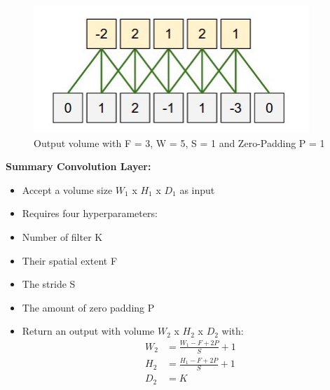 \begin{center}
  \begin{figure}[H]
  \centering
  \includegraphics[width=1\columnwidth]{images/chap2/Output_volume_WSP.png}
  \caption{Output volume with F = 3, W = 5, S = 1 and Zero-Padding P = 1 }
  \label{chap2:Outputvolume_example}
  \end{figure}
\end{center}
\textbf{Summary Convolution Layer:}
\begin{itemize}
	\item Accept a volume size $W_{1}$ x $H_{1}$ x $D_{1}$ as input
	\item Requires four hyperparameters:
	\item Number of filter K
	\item Their spatial extent F 
	\item The stride S
	\item The amount of zero padding P
	\item Return an output with volume $W_{2}$ x $H_{2}$ x $D_{2}$ with:
	\begin{align*}
		W_{2} &= \frac{W_{1} - F + 2P }{S} + 1 \\
		H_{2} &= \frac{H_{1} - F + 2P }{S} + 1 \\
		D_{2} &= K
	\end{align*}
\end{itemize}

